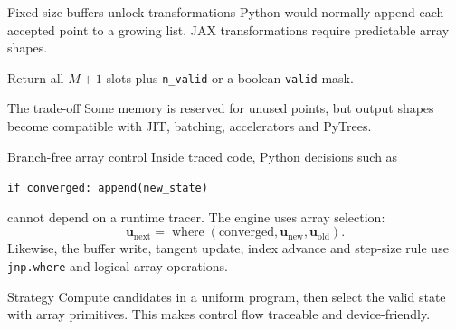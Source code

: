 \documentclass[aspectratio=169,10pt]{beamer}
\newcommand{\state}{\bm{u}}
\begin{document}
\begin{frame}{Fixed-size buffers unlock transformations}
Python would normally append each accepted point to a growing list. JAX transformations require predictable array shapes.
\begin{center}
\end{center}
Return all $M+1$ slots plus \texttt{n\_valid} or a boolean \texttt{valid} mask.
\begin{block}{The trade-off}
Some memory is reserved for unused points, but output shapes become compatible with JIT, batching, accelerators and PyTrees.
\end{block}
\end{frame}

\begin{frame}{Branch-free array control}
Inside traced code, Python decisions such as
\begin{center}
\texttt{if converged: append(new\_state)}
\end{center}
cannot depend on a runtime tracer. The engine uses array selection:
\[
\state_{\mathrm{next}}=\operatorname{where}
(\text{converged},\state_{\mathrm{new}},\state_{\mathrm{old}}).
\]
Likewise, the buffer write, tangent update, index advance and step-size rule use \texttt{jnp.where} and logical array operations.
\begin{block}{Strategy}
Compute candidates in a uniform program, then select the valid state with array primitives. This makes control flow traceable and device-friendly.
\end{block}
\end{frame}
\end{document}
